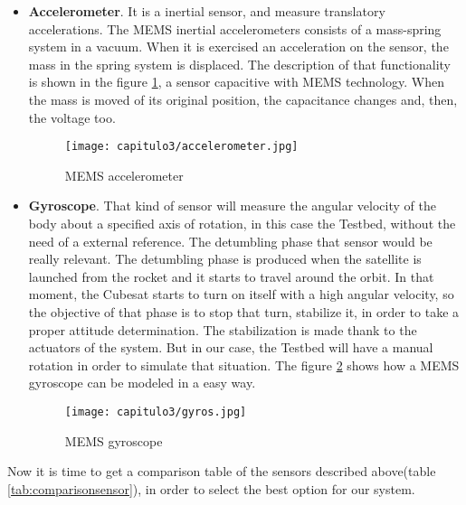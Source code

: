 \begin{itemize}
\item \textbf{Accelerometer}. It is a inertial sensor, and measure translatory accelerations. The \acrshort{MEMS}  inertial accelerometers consists of a mass-spring system in a vacuum. When it is exercised an acceleration on the sensor, the mass in the spring system is displaced. The description of that functionality is shown in the figure \ref{fig:accelerometer}, a sensor capacitive with \acrshort{MEMS} technology. When the mass is moved of its original position, the capacitance changes and, then, the voltage too.

\begin{figure}[H]
	\centering
		\texttt{[image: capitulo3/accelerometer.jpg]}
	\caption{\acrshort{MEMS} accelerometer\cite{accelerometer}}
	\label{fig:accelerometer}
\end{figure}


\item \textbf{Gyroscope}. That kind of sensor will measure the angular velocity of the body about a specified axis of rotation, in this case the Testbed, without the need of a external reference.
The detumbling phase that sensor would be really relevant.
The detumbling phase is produced when the satellite is launched from the rocket and it starts to travel around the orbit. In that moment, the Cubesat starts to turn on itself with a high angular velocity, so the objective of that phase is to stop that turn, stabilize it, in order to take a proper attitude determination. The stabilization is made thank to the actuators of the system. But in our case, the Testbed will have a manual rotation in order to simulate that situation.
The figure \ref{fig:gyros} shows how a \acrshort{MEMS} gyroscope can be modeled in a easy way.

\begin{figure}[H]
	\centering
		\texttt{[image: capitulo3/gyros.jpg]}
	\caption{\acrshort{MEMS} gyroscope\cite{gyros}}
	\label{fig:gyros}
\end{figure}

\end{itemize}

Now it is time to get a comparison table  of the sensors described above(table \ref{tab:comparisonsensor}), in order to select the best option for our system.
 
